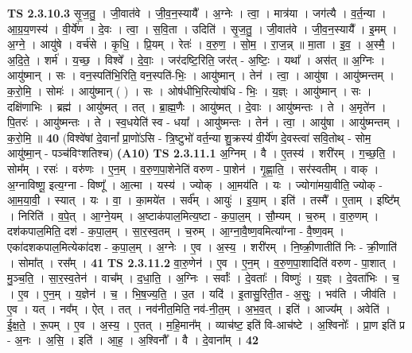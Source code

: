 \documentclass[17pt]{extarticle}
\begin{document}
                  \newline
                                \textbf{ TS 2.3.10.3} \newline
                  सृ॒ज॒तु॒ । जी॒वात॑वे । जी॒व॒न॒स्यायै᳚ । अ॒ग्नेः । त्वा॒ । मात्र॑या । जग॑त्यै । व॒र्त॒न्या । आ॒ग्र॒य॒णस्य॑ । वी॒र्ये॑ण । दे॒वः । त्वा॒ । स॒वि॒ता । उदिति॑ । सृ॒ज॒तु॒ । जी॒वात॑वे । जी॒व॒न॒स्यायै᳚ । इ॒मम् । अ॒ग्ने॒ । आयु॑षे । वर्च॑से । कृ॒धि॒ । प्रि॒यम् । रेतः॑ । व॒रु॒ण॒ । सो॒म॒ । रा॒ज॒न्न् ॥ मा॒ता । इ॒व॒ । अ॒स्मै॒ । अ॒दि॒ते॒ । शर्म॑ । य॒च्छ॒ । विश्वे᳚ । दे॒वाः॒ । जर॑दष्टि॒रिति॒ जर॑त् - अ॒ष्टिः॒ । यथा᳚ । अस॑त् ॥ अ॒ग्निः । आयु॑ष्मान् । सः । वन॒स्पति॑भि॒रिति॒ वन॒स्पति॑-भिः॒ । आयु॑ष्मान् । तेन॑ । त्वा॒ । आयु॑षा । आयु॑ष्मन्तम् । क॒रो॒मि॒ । सोमः॑ । आयु॑ष्मान् ( ) । सः । ओष॑धीभि॒रित्योष॑धि - भिः॒ । य॒ज्ञ्ः । आयु॑ष्मान् । सः । दक्षि॑णाभिः । ब्रह्म॑ । आयु॑ष्मत् । तत् । ब्रा॒ह्म॒णैः । आयु॑ष्मत् । दे॒वाः । आयु॑ष्मन्तः । ते । अ॒मृते॑न । पि॒तरः॑ । आयु॑ष्मन्तः । ते । स्व॒धयेति॑ स्व - धया᳚ । आयु॑ष्मन्तः । तेन॑ । त्वा॒ । आयु॑षा । आयु॑ष्मन्तम् । क॒रो॒मि॒ ॥ \textbf{  40} \newline
                  \newline
                      (विश्वे॑षां दे॒वानां᳚ प्रा॒णो॑ऽसि - त्रि॒ष्टुभो॑ वर्त॒न्या शु॒क्रस्य॑ वी॒र्ये॑ण दे॒वस्त्वा॑ सवि॒तोथ् - सोम॒ आयु॑ष्मा॒न् - पञ्च॑विꣳशतिश्च)  \textbf{(A10)} \newline \newline
                                \textbf{ TS 2.3.11.1} \newline
                  अ॒ग्निम् । वै । ए॒तस्य॑ । शरी॑रम् । ग॒च्छ॒ति॒ । सोम᳚म् । रसः॑ । वरु॑णः । ए॒न॒म् । व॒रु॒ण॒पा॒शेनेति॑ वरुण - पा॒शेन॑ । गृ॒ह्णा॒ति॒ । सर॑स्वतीम् । वाक् । अ॒ग्नाविष्णू॒ इत्य॒ग्ना - विष्णू᳚ । आ॒त्मा । यस्य॑ । ज्योक् । आ॒मय॑ति । यः । ज्योगा॑मया॒वीति॒ ज्योक् - आ॒म॒या॒वी॒ । स्यात् । यः । वा॒ । का॒मये॑त । सर्व᳚म् । आयुः॑ । इ॒या॒म् । इति॑ । तस्मै᳚ । ए॒ताम् । इष्टि᳚म् । निरिति॑ । व॒पे॒त् । आ॒ग्ने॒यम् । अ॒ष्टाक॑पाल॒मित्य॒ष्टा - क॒पा॒ल॒म् । सौ॒म्यम् । च॒रुम् । वा॒रु॒णम् । दश॑कपाल॒मिति॒ दश॑ - क॒पा॒ल॒म् । सा॒र॒स्व॒तम् । च॒रुम् । आ॒ग्ना॒वै॒ष्ण॒वमित्या᳚ग्ना - वै॒ष्ण॒वम् । एका॑दशकपाल॒मित्येका॑दश - क॒पा॒ल॒म् । अ॒ग्नेः । ए॒व । अ॒स्य॒ । शरी॑रम् । नि॒ष्क्री॒णातीति॑ निः - क्री॒णाति॑ । सोमा᳚त् । रस᳚म् । \textbf{  41} \newline
                  \newline
                                \textbf{ TS 2.3.11.2} \newline
                  वा॒रु॒णेन॑ । ए॒व । ए॒न॒म् । व॒रु॒ण॒पा॒शादिति॑ वरुण - पा॒शात् । मु॒ञ्च॒ति॒ । सा॒र॒स्व॒तेन॑ । वाच᳚म् । द॒धा॒ति॒ । अ॒ग्निः । सर्वाः᳚ । दे॒वताः᳚ । विष्णुः॑ । य॒ज्ञ्ः । दे॒वता॑भिः । च॒ । ए॒व । ए॒न॒म् । य॒ज्ञेन॑ । च॒ । भि॒ष॒ज्य॒ति॒ । उ॒त । यदि॑ । इ॒तासु॒रिती॒त - अ॒सुः॒ । भव॑ति । जीव॑ति । ए॒व । यत् । नव᳚म् । ऐत् । तत् । नव॑नीत॒मिति॒ नव॑-नी॒त॒म् । अ॒भ॒व॒त् । इति॑ । आज्य᳚म् । अवेति॑ । ई॒क्ष॒ते॒ । रू॒पम् । ए॒व । अ॒स्य॒ । ए॒तत् । म॒हि॒मान᳚म् । व्याच॑ष्ट॒ इति॑ वि-आच॑ष्टे । अ॒श्विनोः᳚ । प्रा॒ण इति॑ प्र - अ॒नः । अ॒सि॒ । इति॑ । आ॒ह॒ । अ॒श्विनौ᳚ । वै । दे॒वाना᳚म् । \textbf{  42} \newline
\end{document}
